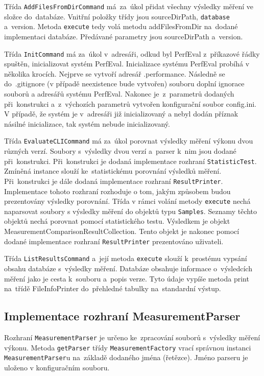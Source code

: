 Třída \lstinline{AddFilesFromDirCommand} má~za~úkol přidat všechny výsledky měření ve složce do~databáze. Vnitřní položky
třídy jsou sourceDirPath, \lstinline{database} a~version. Metoda \lstinline{execute} tedy volá metodu addFilesFromDir na~dodané implementaci
databáze. Předávané parametry jsou sourceDirPath a~version.

Třída \lstinline{InitCommand} má za~úkol v~adresáři, odkud byl PerfEval z~příkazové řádky spuštěn, inicializovat systém PerfEval.
Inicializace systému PerfEval probíhá v několika krocích. Nejprve se vytvoří adresář .performance. Následně se do~.gitignore
(v případě neexistence bude vytvořen) souboru doplní ignorace souborů a adresářů systému PerfEval. Nakonec je~z~parametrů
dodaných při~konstrukci a~z~výchozích parametrů vytvořen konfigurační soubor config.ini. V případě, že systém je
v~adresáři již inicializovaný a nebyl dodán příznak násilné inicializace, tak systém nebude inicializovaný.

Třída \lstinline{EvaluateCLICommand} má za~úkol porovnat výsledky měření výkonu dvou různých verzí.
Soubory s~výsledky dvou verzí a~parser k~nim jsou dodané při~konstrukci. Při~konstrukci
je dodaná implementace rozhraní \lstinline{StatisticTest}. Zmíněná instance slouží ke~statistickému
porovnání výsledků měření. Při~konstrukci je dále dodaná implementace rozhraní \lstinline{ResultPrinter}.
Implementace tohoto rozhraní rozhoduje o tom, jakým způsobem budou prezentovány výsledky porovnání.
Třída v rámci volání metody \lstinline{execute} nechá naparsovat soubory s výsledky měření do objektů typu \lstinline{Samples}.
Seznamy těchto objektů nechá porovnat pomocí statistického testu. Výsledkem je objekt MeasurementComparisonResultCollection.
Tento objekt je nakonec pomocí dodané implementace rozhraní \lstinline{ResultPrinter} prezentováno uživateli.

Třída \lstinline{ListResultsCommand} a~její metoda \lstinline{execute} slouží k~prostému vypsání obsahu databáze s~výsledky měření.
Databáze obsahuje informace o~výsledcích měření jako je cesta k~souboru a~popis verze. Tyto údaje vypíše
metoda print na~třídě FileInfoPrinter do~přehledné tabulky na~standardní výstup.

\subsection{Implementace rozhraní MeasurementParser}

Rozhraní \lstinline{MeasurementParser} je určeno ke~zpracování souborů s~výsledky měření výkonu.
Metoda \lstinline{getParser} třídy \lstinline{MeasurementFactory} vrací správnou instanci \lstinline{MeasurementParser}u na~základě dodaného jména (řetězce).
Jméno parseru je uloženo v konfiguračním souboru.


